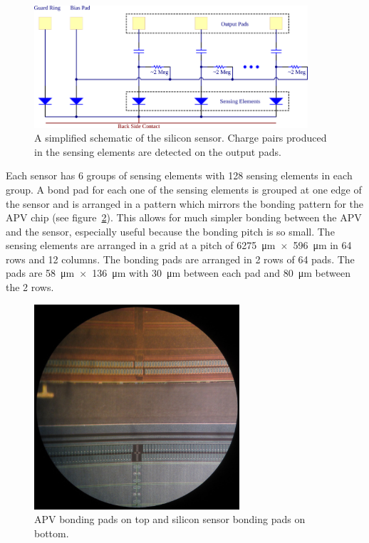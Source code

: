 \documentclass[1p,12pt]{elsarticle}
\begin{document}
\begin{figure}[h]
\begin{center}
\includegraphics[width=4in, keepaspectratio=true, angle=0]{graphics/sensor_sch.png}
\caption{A simplified schematic of the silicon sensor.  Charge pairs produced in
the sensing elements are detected on the output pads.
\label{fig:sensor_sch}}
\end{center}
\end{figure}
%
Each sensor has 6 groups of sensing elements with 128 sensing elements in each
group. A bond pad for each one of the sensing elements is grouped at one edge
of the sensor and is arranged in a pattern which mirrors the bonding pattern for
the APV chip (see figure~\ref{fig:bonding_pads}). This allows for much simpler bonding between the APV and the
sensor, especially useful because the bonding pitch is so small. The sensing
elements are arranged in a grid at a pitch of \SI{6275}{\micro\meter}~$\times$~\SI{596}{\micro\meter} in 64 rows and 12
columns. The bonding pads are arranged in 2 rows of 64 pads. The pads are
\SI{58}{\micro\meter}~$\times$~\SI{136}{\micro\meter} with \SI{30}{\micro\meter} between each pad and \SI{80}{\micro\meter} between the 2 rows.

\begin{figure}[ht]
\begin{center}
\includegraphics[width=3in, keepaspectratio=true, angle=0]{graphics/bonding_pads.jpg}
\caption{APV bonding pads on top and silicon sensor bonding pads on bottom.
\label{fig:bonding_pads}}
\end{center}
\end{figure}
%
\end{document}
